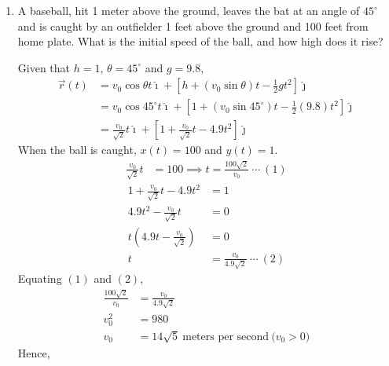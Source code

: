 \begin{enumerate}
          \newpage
    \item A baseball, hit 1 meter above the ground, leaves the bat at an angle of
          $45^{\circ}$ and is caught by an outfielder 1 feet above the ground and 100
          feet from home plate. What is the initial speed of the ball, and how high does
          it rise?

          \sol{}  Given that $h = 1$, $\theta = 45^{\circ}$ and $g = 9.8$,
          \begin{align*}
              \vec{r}(t) & = v_0\cos\theta t\hat{\imath} + \left[h + (v_0\sin\theta) t - \frac{1}{2}gt^2\right]\hat{\jmath}                 \\
                         & = v_0\cos{45^{\circ}} t\hat{\imath} + \left[1 + (v_0\sin{45^{\circ}}) t - \frac{1}{2}(9.8)t^2\right]\hat{\jmath} \\
                         & = \frac{v_0}{\sqrt{2}} t\hat{\imath} + \left[1 + \frac{v_0}{\sqrt{2}} t - 4.9t^2\right]\hat{\jmath}
          \end{align*}
          When the ball is caught, $x(t) = 100$ and $y(t) = 1$.
          \begin{align*}
              \frac{v_0}{\sqrt{2}} t & = 100 \implies t = \frac{100\sqrt{2}}{v_0}\ \cdots\ (1)
          \end{align*}
          \vspace{-2.4em}
          \begin{align*}
              1 + \frac{v_0}{\sqrt{2}} t - 4.9t^2 & = 1                                     \\
              4.9t^2 - \frac{v_0}{\sqrt{2}} t     & = 0                                     \\
              t(4.9t - \frac{v_0}{\sqrt{2}})      & = 0                                     \\
              t                                   & = \frac{v_0}{4.9\sqrt{2}} \ \cdots\ (2)
          \end{align*}
          Equating $(1)$ and $(2)$,
          \begin{align*}
              \frac{100\sqrt{2}}{v_0} & = \frac{v_0}{4.9\sqrt{2}}                                  \\
              v_0^2                   & = 980                                                      \\
              v_0                     & = 14\sqrt{5}\ \text{meters per second}\ \text{($v_0 > 0$)}
          \end{align*}
          Hence,

\end{enumerate}
